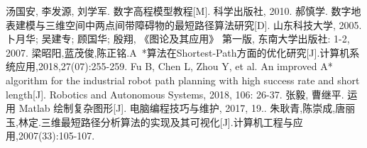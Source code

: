 \cleardoublepage{}
{}
\begin{thebibliography}{00}
   汤国安, 李发源, 刘学军. 数字高程模型教程[M]. 科学出版社, 2010.
   郝慎学. 数字地表建模与三维空间中两点间带障碍物的最短路径算法研究[D]. 山东科技大学, 2005.
   卜月华; 吴建专; 顾国华; 殷翔, 《图论及其应用》 第一版, 东南大学出版社: 1-2, 2007.
   梁昭阳,蓝茂俊,陈正铭.A~*算法在Shortest-Path方面的优化研究[J].计算机系统应用,2018,27(07):255-259.
   Fu B, Chen L, Zhou Y, et al. An improved A* algorithm for the industrial robot path planning with high success rate and short length[J]. Robotics and Autonomous Systems, 2018, 106: 26-37.
   张毅, 曹继平. 运用 Matlab 绘制复杂图形[J]. 电脑编程技巧与维护, 2017, 19..
   朱耿青,陈崇成,唐丽玉,林定.三维最短路径分析算法的实现及其可视化[J].计算机工程与应用,2007(33):105-107.
\end{thebibliography}